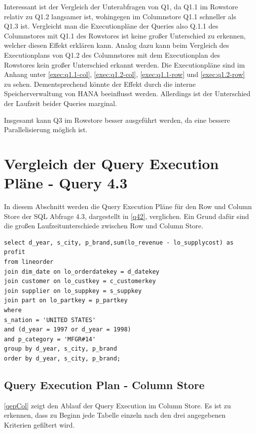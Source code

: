 Interessant ist der Vergleich der Unterabfragen von Q1, da Q1.1
im Rowstore relativ zu Q1.2 langsamer ist, wohingegen im Columnstore
Q1.1 schneller als Q1.3 ist.
Vergleicht man die Executionpläne der Queries also Q.1.1 des Columnstores mit Q1.1 des Rowstores ist keine großer Unterschied zu erkennen, welcher diesen Effekt
erklären kann.
Analog dazu kann beim Vergleich des Executionplans von Q1.2 des Columnstores
mit dem Executionplan des Rowstores kein großer Unterschied erkannt werden.
Die Executionpläne sind im Anhang unter \autoref{exec:q1.1-col},
\autoref{exec:q1.2-col}, \autoref{exec:q1.1-row} und \autoref{exec:q1.2-row}
zu sehen.
Dementsprechend könnte der Effekt durch die interne Speicherverwaltung von HANA
beeinflusst werden.
Allerdings ist der Unterschied der Laufzeit beider Queries marginal.

Insgesamt kann Q3 im Rowstore besser ausgeführt werden,
da eine bessere Parallelisierung möglich ist.

\section{Vergleich der Query Execution Pläne - Query 4.3}
In diesem Abschnitt werden die Query Execution Pläne für den Row und Column Store der SQL Abfrage 4.3, dargestellt in \autoref{q42}, verglichen. Ein Grund dafür sind die großen Laufzeitunterschiede zwischen Row und Column Store.
\begin{lstlisting}[label=q42, caption={Benchmark Query 4.3}]
select d_year, s_city, p_brand,sum(lo_revenue - lo_supplycost) as profit
from lineorder
join dim_date on lo_orderdatekey = d_datekey
join customer on lo_custkey = c_customerkey
join supplier on lo_suppkey = s_suppkey
join part on lo_partkey = p_partkey
where
s_nation = 'UNITED STATES'
and (d_year = 1997 or d_year = 1998)
and p_category = 'MFGR#14'
group by d_year, s_city, p_brand
order by d_year, s_city, p_brand;
\end{lstlisting}

\subsection{Query Execution Plan - Column Store}
\autoref{qepCol} zeigt den Ablauf der Query Execution im Column Store. Es ist zu erkennen, dass zu Beginn jede Tabelle einzeln nach den drei angegebenen Kriterien gefiltert wird.

